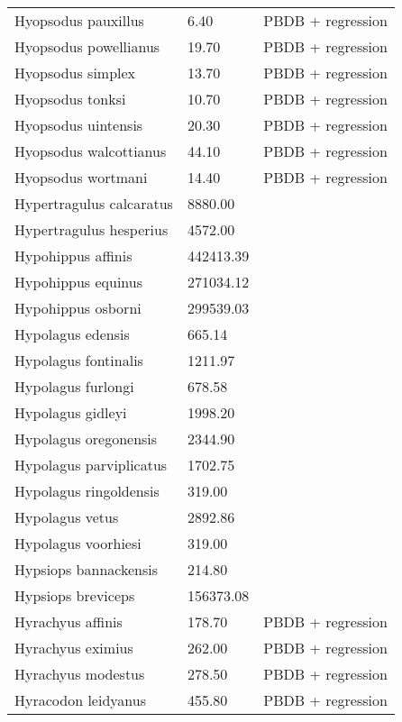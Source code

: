\documentclass{article}
\begin{document}
\begin{center}
\begin{longtable}{p{} p{} p{}}
    Hyopsodus pauxillus & 6.40 & PBDB + regression \\ 
    Hyopsodus powellianus & 19.70 & PBDB + regression \\ 
    Hyopsodus simplex & 13.70 & PBDB + regression \\ 
    Hyopsodus tonksi & 10.70 & PBDB + regression \\ 
    Hyopsodus uintensis & 20.30 & PBDB + regression \\ 
    Hyopsodus walcottianus & 44.10 & PBDB + regression \\ 
    Hyopsodus wortmani & 14.40 & PBDB + regression \\ 
    Hypertragulus calcaratus & 8880.00 & \cite{McKenna2011} \\ 
    Hypertragulus hesperius & 4572.00 & \cite{McKenna2011} \\ 
    Hypohippus affinis & 442413.39 & \cite{Tomiya2013} \\ 
    Hypohippus equinus & 271034.12 & \cite{Tomiya2013} \\ 
    Hypohippus osborni & 299539.03 & \cite{Tomiya2013} \\ 
    Hypolagus edensis & 665.14 & \cite{Tomiya2013} \\ 
    Hypolagus fontinalis & 1211.97 & \cite{Tomiya2013} \\ 
    Hypolagus furlongi & 678.58 & \cite{Tomiya2013} \\ 
    Hypolagus gidleyi & 1998.20 & \cite{Tomiya2013} \\ 
    Hypolagus oregonensis & 2344.90 & \cite{Tomiya2013} \\ 
    Hypolagus parviplicatus & 1702.75 & \cite{Tomiya2013} \\ 
    Hypolagus ringoldensis & 319.00 & \cite{McKenna2011} \\ 
    Hypolagus vetus & 2892.86 & \cite{Tomiya2013} \\ 
    Hypolagus voorhiesi & 319.00 & \cite{McKenna2011} \\ 
    Hypsiops bannackensis & 214.80 & \cite{Wang1999} \\ 
    Hypsiops breviceps & 156373.08 & \cite{Tomiya2013} \\ 
    Hyrachyus affinis & 178.70 & PBDB + regression \\ 
    Hyrachyus eximius & 262.00 & PBDB + regression \\ 
    Hyrachyus modestus & 278.50 & PBDB + regression \\ 
    Hyracodon leidyanus & 455.80 & PBDB + regression \\ 

\end{longtable}
\end{center}
\end{document}
